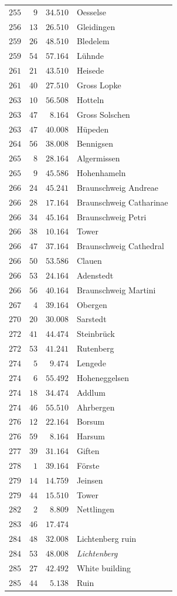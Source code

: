 \begin{longtable}{@{}rrrp{.61\linewidth}@{}}
\(255\)&\(9\)&\(34.510\)&\raggedright Oesselse\tabularnewline
\(256\)&\(13\)&\(26.510\)&\raggedright Gleidingen\tabularnewline
\(259\)&\(26\)&\(48.510\)&\raggedright Bledelem\tabularnewline
\(259\)&\(54\)&\(57.164\)&\raggedright Lühnde\tabularnewline
\(261\)&\(21\)&\(43.510\)&\raggedright Heisede\tabularnewline
\(261\)&\(40\)&\(27.510\)&\raggedright Gross Lopke\tabularnewline
\(263\)&\(10\)&\(56.508\)&\raggedright Hotteln\tabularnewline
\(263\)&\(47\)&\(8.164\)&\raggedright Gross Solschen\tabularnewline
\(263\)&\(47\)&\(40.008\)&\raggedright Hüpeden\tabularnewline
\(264\)&\(56\)&\(38.008\)&\raggedright Bennigsen\tabularnewline
\(265\)&\(8\)&\(28.164\)&\raggedright Algermissen\tabularnewline
\(265\)&\(9\)&\(45.586\)&\raggedright Hohenhameln\tabularnewline
\(266\)&\(24\)&\(45.241\)&\raggedright Braunschweig Andreae\tabularnewline
\(266\)&\(28\)&\(17.164\)&\raggedright Braunschweig Catharinae\tabularnewline
\(266\)&\(34\)&\(45.164\)&\raggedright Braunschweig Petri\tabularnewline
\(266\)&\(38\)&\(10.164\)&\raggedright Tower\tabularnewline
\(266\)&\(47\)&\(37.164\)&\raggedright Braunschweig Cathedral\tabularnewline
\(266\)&\(50\)&\(53.586\)&\raggedright Clauen\tabularnewline
\(266\)&\(53\)&\(24.164\)&\raggedright Adenstedt\tabularnewline
\(266\)&\(56\)&\(40.164\)&\raggedright Braunschweig Martini\tabularnewline
\(267\)&\(4\)&\(39.164\)&\raggedright Obergen\tabularnewline
\(270\)&\(20\)&\(30.008\)&\raggedright Sarstedt\tabularnewline
\(272\)&\(41\)&\(44.474\)&\raggedright Steinbrück\tabularnewline
\(272\)&\(53\)&\(41.241\)&\raggedright Rutenberg\tabularnewline
\(274\)&\(5\)&\(9.474\)&\raggedright Lengede\tabularnewline
\(274\)&\(6\)&\(55.492\)&\raggedright Hoheneggelsen\tabularnewline
\(274\)&\(18\)&\(34.474\)&\raggedright Addlum\tabularnewline
\(274\)&\(46\)&\(55.510\)&\raggedright Ahrbergen\tabularnewline
\(276\)&\(12\)&\(22.164\)&\raggedright Borsum\tabularnewline
\(276\)&\(59\)&\(8.164\)&\raggedright Harsum\tabularnewline
\(277\)&\(39\)&\(31.164\)&\raggedright Giften\tabularnewline
\(278\)&\(1\)&\(39.164\)&\raggedright Förste\tabularnewline
\(279\)&\(14\)&\(14.759\)&\raggedright Jeinsen\tabularnewline
\(279\)&\(44\)&\(15.510\)&\raggedright Tower\tabularnewline
\(282\)&\(2\)&\(8.809\)&\raggedright Nettlingen\tabularnewline
\(283\)&\(46\)&\(17.474\)&\raggedright \tabularnewline
\(284\)&\(48\)&\(32.008\)&\raggedright Lichtenberg ruin\tabularnewline
\(284\)&\(53\)&\(48.008\)&\raggedright \textit{Lichtenberg}\tabularnewline
\(285\)&\(27\)&\(42.492\)&\raggedright White building\tabularnewline
\(285\)&\(44\)&\(5.138\)&\raggedright Ruin\tabularnewline
\end{longtable}
\endgroup
